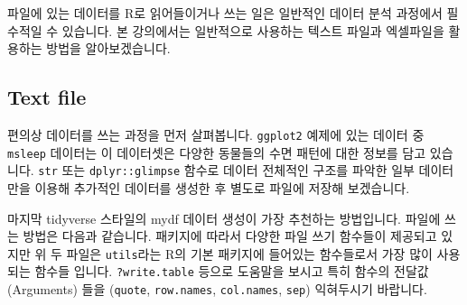 \documentclass[
  a4paper,
]{book}
\newenvironment{Shaded}{\begin{snugshade}}{\end{snugshade}}
\newcommand{\AttributeTok}[1]{\textcolor[rgb]{0.40,0.45,0.13}{#1}}
\newcommand{\FunctionTok}[1]{\textcolor[rgb]{0.28,0.35,0.67}{#1}}
\newcommand{\NormalTok}[1]{\textcolor[rgb]{0.00,0.23,0.31}{#1}}
\newcommand{\OtherTok}[1]{\textcolor[rgb]{0.00,0.23,0.31}{#1}}
\newcommand{\SpecialCharTok}[1]{\textcolor[rgb]{0.37,0.37,0.37}{#1}}
\newcommand{\StringTok}[1]{\textcolor[rgb]{0.13,0.47,0.30}{#1}}
\begin{document}
파일에 있는 데이터를 R로 읽어들이거나 쓰는 일은 일반적인 데이터 분석
과정에서 필수적일 수 있습니다. 본 강의에서는 일반적으로 사용하는 텍스트
파일과 엑셀파일을 활용하는 방법을 알아보겠습니다.

\hypertarget{text-file}{%
\subsection{Text file}\label{text-file}}

편의상 데이터를 쓰는 과정을 먼저 살펴봅니다. \texttt{ggplot2} 예제에
있는 데이터 중 \texttt{msleep} 데이터는 이 데이터셋은 다양한 동물들의
수면 패턴에 대한 정보를 담고 있습니다. \texttt{str} 또는
\texttt{dplyr::glimpse} 함수로 데이터 전체적인 구조를 파악한 일부
데이터만을 이용해 추가적인 데이터를 생성한 후 별도로 파일에 저장해
보겠습니다.

\begin{Shaded}
\end{Shaded}

마지막 tidyverse 스타일의 mydf 데이터 생성이 가장 추천하는 방법입니다.
파일에 쓰는 방법은 다음과 같습니다. 패키지에 따라서 다양한 파일 쓰기
함수들이 제공되고 있지만 위 두 파일은 \texttt{utils}라는 R의 기본
패키지에 들어있는 함수들로서 가장 많이 사용되는 함수들 입니다.
\texttt{?write.table} 등으로 도움말을 보시고 특히 함수의 전달값
(Arguments) 들을 (\texttt{quote}, \texttt{row.names},
\texttt{col.names}, \texttt{sep}) 익혀두시기 바랍니다.
\end{document}

